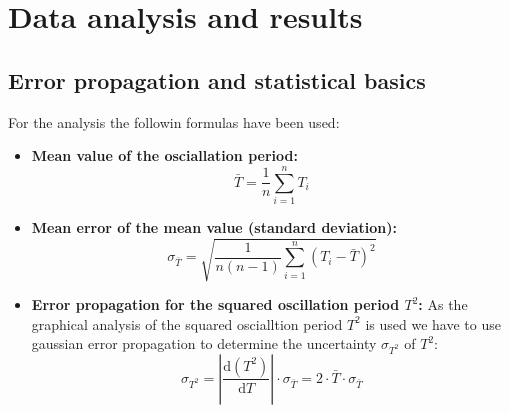 \section{Data analysis and results}

\subsection{Error propagation and statistical basics}
For the analysis the followin formulas have been used:
\begin{itemize}
    \item \textbf{Mean value of the osciallation period:}
    \begin{equation}
        \bar{T} = \frac{1}{n} \sum_{i=1}^{n} T_i
    \end{equation}
    
    \item \textbf{Mean error of the mean value (standard deviation):}
    \begin{equation}
        \sigma_{\bar{T}} = \sqrt{\frac{1}{n(n-1)} \sum_{i=1}^{n} (T_i - \bar{T})^2}
    \end{equation}
    
    \item \textbf{Error propagation for the squared oscillation period $T^2$:}
    As the graphical analysis of the squared oscialltion period $T^2$ is used we have to use gaussian error propagation to determine the uncertainty $\sigma_{T^2}$ of $T^2$:
    \begin{equation}
        \sigma_{T^2} = \left| \frac{\mathrm{d}(T^2)}{\mathrm{d}T} \right| \cdot \sigma_{\bar{T}} = 2 \cdot \bar{T} \cdot \sigma_{\bar{T}}
        \label{eq:fehler_t2}
    \end{equation}
\end{itemize}



